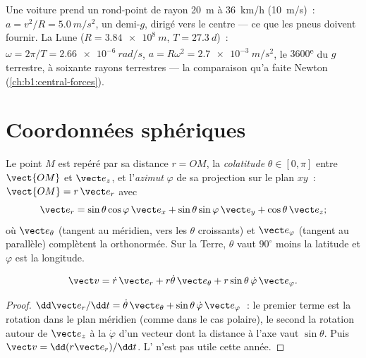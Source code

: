 \begin{example}\label{ex:b1:point-kinematics:circles}
Une voiture prend un rond-point de rayon \qty{20}{m} à \qty{36}{km/h}
(\qty{10}{m/s})~: $a = v^2/R = \qty{5.0}{m/s^2}$, un demi-$g$, dirigé
vers le centre --- ce que les pneus doivent fournir. La Lune
($R = \qty{3.84e8}{m}$, $T = \qty{27.3}{d}$)~: $\omega = 2\pi/T =
\qty{2.66e-6}{rad/s}$, $a = R\omega^2 = \qty{2.7e-3}{m/s^2}$, le
$3600$\textsuperscript{e} du $g$ terrestre, à soixante rayons terrestres
--- la comparaison qu'a faite Newton (\cref{ch:b1:central-forces}).
\end{example}

\section{Coordonnées sphériques}

\begin{definition}\label{def:b1:point-kinematics:spherical}
Le point $M$ est repéré par sa distance $r = OM$, la \emph{colatitude}
$\theta \in [0, \pi]$ entre $\vect{OM}$ et $\vect e_z$, et l'\emph{azimut}
$\varphi$ de sa projection sur le plan $xy$~:
$\vect{OM} = r\,\vect e_r$ avec
\[
\vect e_r = \sin\theta\cos\varphi\,\vect e_x + \sin\theta\sin\varphi\,\vect e_y + \cos\theta\,\vect e_z ;
\]
où $\vect e_\theta$ (tangent au méridien, vers les $\theta$ croissants)
et $\vect e_\varphi$ (tangent au parallèle) complètent la 
orthonormée. Sur la Terre, $\theta$ vaut $90^\circ$ moins la latitude et
$\varphi$ est la longitude.
\end{definition}

\begin{proposition}\label{prop:b1:point-kinematics:sphericalv}
\[
\vect v = \dot r\,\vect e_r + r\dot\theta\,\vect e_\theta + r\sin\theta\,\dot\varphi\,\vect e_\varphi .
\]
\end{proposition}

\begin{proof}
$\dd\vect e_r/\dd t = \dot\theta\,\vect e_\theta + \sin\theta\,\dot\varphi\,
\vect e_\varphi$~: le premier terme est la rotation dans le plan
méridien (comme dans le cas polaire), le second la rotation autour de
$\vect e_z$ à la  $\dot\varphi$ d'un vecteur dont la distance à
l'axe vaut $\sin\theta$. Puis $\vect v = \dd(r\vect e_r)/\dd t$.
L' n'est pas utile cette année.
\end{proof}

